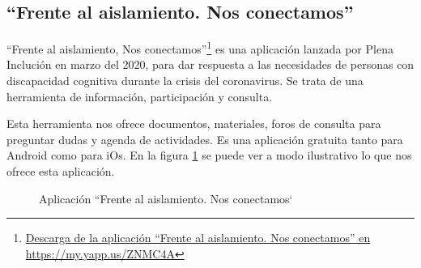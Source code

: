 \subsection{``Frente al aislamiento. Nos conectamos'' }

``Frente al aislamiento, Nos conectamos''\footnote{\href{https://my.yapp.us/ZNMC4A}{Descarga de la aplicación ``Frente al aislamiento. Nos conectamos'' en https://my.yapp.us/ZNMC4A}} es una aplicación lanzada por Plena Inclución en marzo del 2020, para dar respuesta a las necesidades de personas con discapacidad cognitiva durante la crisis del coronavirus. Se trata de una herramienta de información, participación y consulta.

Esta herramienta nos ofrece documentos, materiales, foros de consulta para preguntar dudas y agenda de actividades. Es una aplicación gratuita tanto para Android como para iOs. En la figura \ref{fig:plenaInclusion} se puede ver a modo ilustrativo lo que nos ofrece esta aplicación.


\begin{figure}[h]
	\centering
	
	\caption{Aplicación ``Frente al aislamiento. Nos conectamos`}
	\label{fig:plenaInclusion}
\end{figure} 


